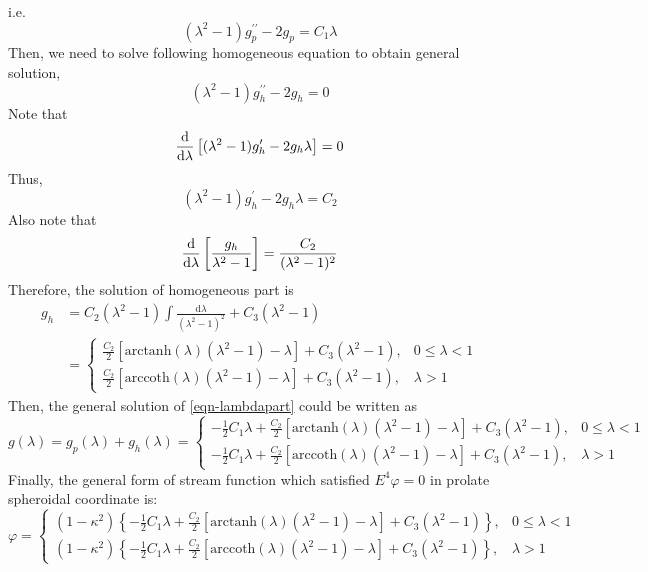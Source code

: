 \documentclass[fontsize=11pt, %
                             paper=a4, %
                             twoside, %
                             captions=tableheading,
                             index=totoc,
                             hyperref]{labbook}
\begin{document}
\begin{addmargin}[4cm]{0cm}
\begin{equation}
\end{equation}
i.e.
\begin{equation}
(\lambda^2-1)g^{\prime\prime}_{p}-2g_p=C_1\lambda
\end{equation}
Then, we need to solve following homogeneous equation to obtain general solution,
\begin{equation}
(\lambda^2-1)g_h^{\prime\prime}-2g_{h}=0
\end{equation}
Note that
\begin{equation}
\frac{\mathrm{d} }{\mathrm{d} \lambda}\left[(\lambda^2-1)g_h^\prime-2g_h\lambda\right]=0
\end{equation}
Thus,
\begin{equation}
(\lambda^2-1)g_h^\prime-2g_h\lambda=C_2
\end{equation}
Also note that
\begin{equation}
\frac{\mathrm{d} }{\mathrm{d} \lambda}\left[\frac{g_h}{\lambda^2-1}\right]=\frac{C_2}{(\lambda^2-1)^2}
\end{equation}
Therefore, the solution of homogeneous part is
\begin{equation}
\begin{aligned}
g_h&=C_2(\lambda^2-1)\int\frac{\mathrm{d}\lambda}{(\lambda^2-1)^2}+C_3(\lambda^2-1)\\
&=
\begin{cases}
\frac{C_2}{2}\left[\mathrm{arctanh}(\lambda)(\lambda^2-1)-\lambda\right]+C_3(\lambda^2-1),&0\le\lambda<1\\
\frac{C_2}{2}\left[\mathrm{arccoth}(\lambda)(\lambda^2-1)-\lambda\right]+C_3(\lambda^2-1),&\lambda>1
\end{cases}
\end{aligned}
\end{equation}
Then, the general solution of \ref{eqn-lambdapart} could be written as
\begin{equation}
g(\lambda)=g_p(\lambda)+g_h(\lambda)=
\begin{cases}
-\frac{1}{2}C_1\lambda+\frac{C_2}{2}\left[\mathrm{arctanh}(\lambda)(\lambda^2-1)-\lambda\right]+C_3(\lambda^2-1),&0\le\lambda<1\\
-\frac{1}{2}C_1\lambda+\frac{C_2}{2}\left[\mathrm{arccoth}(\lambda)(\lambda^2-1)-\lambda\right]+C_3(\lambda^2-1),&\lambda>1
\end{cases}
\end{equation}
Finally, the general form of stream function which satisfied $E^4\varphi=0$ in prolate spheroidal coordinate is:
\begin{equation}
\varphi=
\begin{cases}
(1-\kappa^2)\left\{-\frac{1}{2}C_1\lambda+\frac{C_2}{2}\left[\mathrm{arctanh}(\lambda)(\lambda^2-1)-\lambda\right]+C_3(\lambda^2-1)\right\},&0\le\lambda<1\\
(1-\kappa^2)\left\{-\frac{1}{2}C_1\lambda+\frac{C_2}{2}\left[\mathrm{arccoth}(\lambda)(\lambda^2-1)-\lambda\right]+C_3(\lambda^2-1)\right\},&\lambda>1
\end{cases}
\end{equation}

\end{addmargin}
\end{document}
